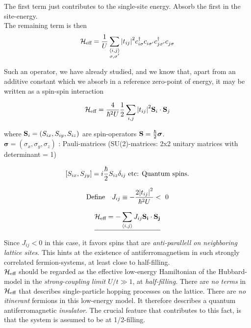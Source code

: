 The first term just contributes to the single-site energy. Absorb the first in the site-energy. \\

The remaining term is then \begin{equation}
	\mathcal{H}_{\text{eff}} = \frac{1}{U} \sum_{\substack{\langle i, j \rangle \\ \sigma, \sigma'}} \abs{t_{ij}}^2 c_{i \sigma}^\dagger c_{i \sigma'}^{} c_{j \sigma'}^\dagger c_{j \sigma}^{}
\end{equation}

Such an operator, we have already studied, and we know that, apart from an additive constant which we absorb in a reference zero-point of energy, it may be written as a spin-spin interaction

\begin{equation}
	\mathcal{H}_{\text{eff}} = \frac{4}{\hbar^2 U} \frac{1}{2} \sum_{i, j} \abs{t_{ij}}^2 \vb{S}_i \cdot \vb{S}_j
\end{equation}

where $\vb{S}_i = (S_{ix}, S_{iy}, S_{iz})$ are spin-operators $\vb{S} = \frac{\hbar}{2} \bm{\sigma}$. \\

$\bm{\sigma} = (\sigma_x, \sigma_y, \sigma_z)$ : Pauli-matrices (SU(2)-matrices: 2x2 unitary matrices with determinant = 1)

\begin{equation}
	\comm{S_{ix}}{S_{jy}} = i\frac{\hbar}{2}S_{iz}\delta_{ij} \ \text{etc: Quantum spins}.
\end{equation}

\begin{equation}
	\text{Define} \quad J_{ij} \equiv - \frac{2 \abs{t_{ij}}^2}{\hbar^2 U} < \ 0
\end{equation}

\begin{equation} \emph{
		\mathcal{H}_{\text{eff}} = -\sum_{\langle i, j \rangle} J_{ij} \vb{S_i} \cdot \vb{S_j}}
\end{equation}

Since $J_{ij} < 0$ in this case, it favors spins that are \emph{anti-parallell on neighboring lattice sites}. This hints at the existence of antiferromagnetism in such strongly correlated fermion-systems, at least close to half-filling. \\

$\mathcal{H}_{\text{eff}}$ should be regarded as the effective low-energy Hamiltonian of the Hubbard-model in the \emph{strong-coupling limit $U/t \gg 1$}, at \emph{half-filling}. There are \emph{no terms} in $\mathcal{H}_{\text{eff}}$ that describes single-particle hopping processes on the lattice. There are \emph{no itinerant} fermions in this low-energy model. It therefore describes a quantum antiferromagnetic \emph{insulator}. The crucial feature that contributes to this fact, is that the system is assumed to be at 1/2-filling. \\

